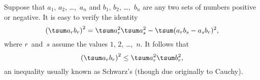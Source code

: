  Suppose that $a_{1}$, $a_{2}$, \dots,~$a_{n}$ and $b_{1}$, $b_{2}$, \dots,~$b_{n}$
are any two sets of numbers positive or negative. It is easy to verify the
identity
\[
\left(\tsum a_{r} b_{r}\right)^{2}
  = \tsum a_{r}^{2} \tsum a_{s}^{2}
  - \tsum (a_{r} b_{s} - a_{s} b_{r})^{2},
\]
where $r$~and~$s$ assume the values $1$, $2$, \dots,~$n$. It follows that
\[
\left(\tsum a_{r} b_{r}\right)^{2} \leq \tsum a_{r}^{2} \tsum b_{r}^{2},
\]
an inequality usually known as Schwarz's (though due originally to Cauchy).


